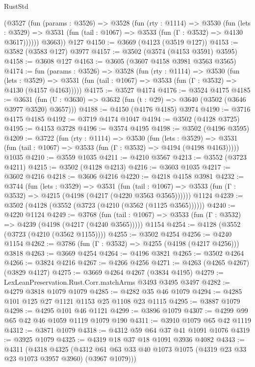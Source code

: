 \begin{lexlean}{RustStd}
\begin{coremodule}
        (@3527
          (fun (params : @3526) =>
          @3528
            (fun (rty : @1114) =>
            @3530
              (fun (lets : @3529) =>
              @3531 (fun (tail : @1067) => @3533 (fun (Γ : @3532) => @4130 @3617))))))
        @3663))
    @127
@4150 := @3669 (@4123 (@3519 @127))
@4153 := @3582 (@3583 @127) @3977
@4157 := @3502 (@3574 (@4153 @3591) @3595)
@4158 := @3608 @127
@4163 := @3605 (@3607 @4158 @3981 @3563 @3565)
@4174 := fun (params : @3526) =>
  @3528
    (fun (rty : @1114) =>
    @3530
      (fun (lets : @3529) =>
      @3531 (fun (tail : @1067) => @3533 (fun (Γ : @3532) => @4130 (@4157 @4163)))))
@4175 := @3527 @4174
@4176 := @3524 @4175
@4185 := @3631 (fun (U : @3630) => @3632 (fun (t : @29) => @3640 (@3502 (@3646 @3977 @3520) @3657)))
@4188 := @4150 (@4176 @4185) @3974
@4190 := @3716 @4175 @4185
@4192 := @3719 @4174 @1047
@4194 := @3502 (@4128 @3725)
@4195 := @4153 @3728
@4196 := @3574 @4195
@4198 := @3502 (@4196 @3595)
@4209 := @3722
    (fun (rty : @1114) =>
    @3530
      (fun (lets : @3529) =>
      @3531 (fun (tail : @1067) => @3533 (fun (Γ : @3532) => @4194 (@4198 @4163)))))
    @1035
@4210 := @3559 @1035
@4211 := @4210 @3567
@4213 := @3552 (@3723 @4211)
@4215 := @3502 (@4128 @4213)
@4216 := @3603 @1035
@4217 := @3602 @4216
@4218 := @3606 @4216
@4220 := @4218 @4158 @3981
@4232 := @3744
    (fun (lets : @3529) =>
    @3531
      (fun (tail : @1067) => @3533 (fun (Γ : @3532) => @4215 (@4198 (@4217 (@4220 @3563 @3565))))))
    @1124
@4239 := @3502 (@4128 (@3552 (@3723 (@4210 (@3562 (@1125 @3565))))))
@4240 := @4220 @1124
@4249 := @3768
    (fun (tail : @1067) => @3533 (fun (Γ : @3532) => @4239 (@4198 (@4217 (@4240 @3565)))))
    @1154
@4254 := @4128 (@3552 (@3723 (@4210 (@3562 @1155))))
@4255 := @3502 @4254
@4256 := @4240 @1154
@4262 := @3786 (fun (Γ : @3532) => @4255 (@4198 (@4217 @4256))) @3818
@4263 := @3669 @4254
@4264 := @4196 @3821
@4265 := @3502 @4264
@4266 := @3824 @4216
@4267 := @4266 @4256
@4271 := @4263 (@4265 @4267) (@3829 @4127)
@4275 := @3669 @4264 @4267 (@3834 @4195)
@4279 := LexLeanPreservation.Rust.Corr.matchArms @3493 @3495 @3497
@4282 := @4279 @3818 @1079 @1079
@4285 := @4282 @35 @46 @1079
@4294 := @4285 @101 @125 @27 @1121 @1153 @25 @1108 @23 @1115
@4295 := @3887 @1079
@4298 := @4295 @101 @46 @1121
@4299 := @3896 @1079
@4307 := @4299 @99 @65 @42 @46 @1059 @1119 @1079 @190
@4311 := @3910 @1079 @65 @42 @1119
@4312 := @3871 @1079
@4318 := @4312 @59 @64 @37 @41 @1091 @1076
@4319 := @3925 @1079
@4325 := @4319 @18 @37 @18 @1091 @3936 @4082
@4343 := @4311
    (@4318
      @4325
      (@4312 @61 @63 @33 @40 @1073 @1075 (@4319 @23 @33 @23 @1073 @3957 @3960) (@3967 @1079)))

\end{coremodule}
\end{lexlean}
